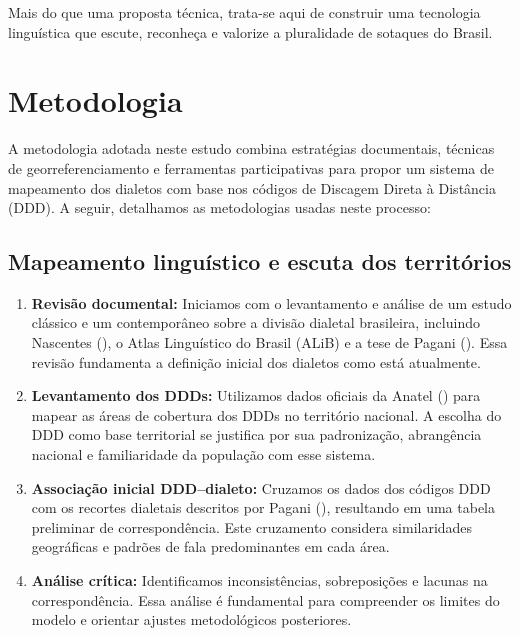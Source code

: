 Mais do que uma proposta técnica, trata-se aqui de construir uma tecnologia linguística que escute, reconheça e valorize a pluralidade de sotaques do Brasil.











\chapter{Metodologia}


A metodologia adotada neste estudo combina estratégias documentais, técnicas de georreferenciamento e ferramentas participativas para propor um sistema de mapeamento dos dialetos com base nos códigos de Discagem Direta à Distância (DDD).  A seguir, detalhamos as metodologias usadas neste processo:

\section{Mapeamento linguístico e escuta dos territórios}

\begin{enumerate}
  \item \textbf{Revisão documental:} Iniciamos com o levantamento e análise de um estudo clássico e um contemporâneo sobre a divisão dialetal brasileira, incluindo Nascentes (\citeyear{nascentes1953}), o Atlas Linguístico do Brasil (ALiB) \cite{cardoso2014alib} e a tese de Pagani (\citeyear{pagani2022}). Essa revisão fundamenta a definição inicial dos dialetos como está atualmente.

  \item \textbf{Levantamento dos DDDs:} Utilizamos dados oficiais da Anatel (\citeyear{anatel_pnb}) para mapear as áreas de cobertura dos DDDs no território nacional. A escolha do DDD como base territorial se justifica por sua padronização, abrangência nacional e familiaridade da população com esse sistema.

  \item \textbf{Associação inicial DDD–dialeto:} Cruzamos os dados dos códigos DDD com os recortes dialetais descritos por Pagani (\citeyear{pagani2022}), resultando em uma tabela preliminar de correspondência. Este cruzamento considera similaridades geográficas e padrões de fala predominantes em cada área.

  \item \textbf{Análise crítica:} Identificamos inconsistências, sobreposições e lacunas na correspondência. Essa análise é fundamental para compreender os limites do modelo e orientar ajustes metodológicos posteriores.
\end{enumerate}


